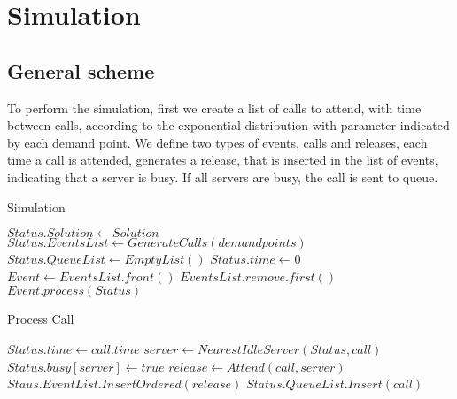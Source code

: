 \section{Simulation}
\subsection{General scheme}
\begin{frame}
  To perform the simulation, first we create a list of calls to attend,
  with time between calls, according to the exponential distribution with
  parameter indicated by each demand point.
  We define two types of events, calls and releases, each time a call is 
  attended, generates a release, that is inserted in the list of events, 
  indicating that a server is busy.
  If all servers are busy, the call is sent to queue.
\end{frame}

\begin{frame}
  \begin{algorithm}
    \hline \vspace{3pt}
    \caption{Simulation}\label{alg_sim}
    \vspace{3pt} \hline
    \begin{algorithmic}[0]
      \State $Status.Solution \gets Solution$
      \State $Status.EventsList \gets GenerateCalls(demandpoints)$
      \State $Status.QueueList \gets EmptyList()$
      \State $Status.time \gets 0$
      \State $Event \gets EventsList.front()$
      \State $EventsList.remove.first()$
      \State $Event.process(Status)$
      \EndWhile
      \EndProcedure
    \end{algorithmic}
    \hline
  \end{algorithm}
\end{frame}

\begin{frame}
  \begin{algorithm}
    \hline \vspace{3pt}
    \caption{Process Call}\label{proc_call}
    \vspace{3pt} \hline
    \begin{algorithmic}[0]
      \State $Status.time \gets call.time$
      \State $server \gets NearestIdleServer(Status,call)$
      \State $Status.busy[server] \gets true$
      \State $release \gets Attend(call,server)$
      \State $Staus.EventList.InsertOrdered(release)$
      \Else
      \State $Status.QueueList.Insert(call)$
      \EndIf
      \EndProcedure
      \hline
    \end{algorithmic}
  \end{algorithm}
\end{frame}

